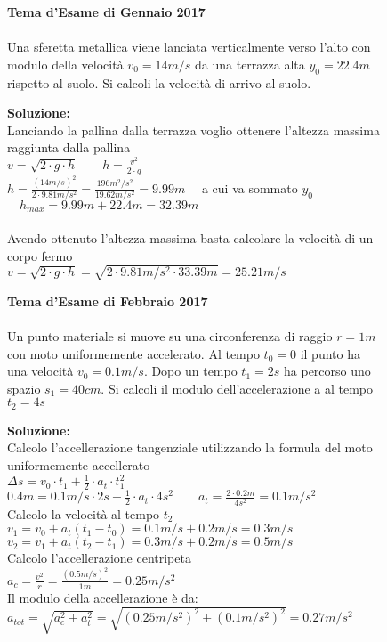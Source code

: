 \begin{figure}[h!]
\textbf{Tema d'Esame di Gennaio 2017}\\ \\
Una sferetta metallica viene lanciata verticalmente verso l’alto con modulo della velocità
$v_0= 14 m/s$  da una terrazza alta $y_0 = 22.4m$ rispetto al suolo. Si calcoli la velocità di arrivo al suolo. \\
\begin{boxed}
\textbf{Soluzione:}\\
Lanciando la pallina dalla terrazza voglio ottenere l'altezza massima raggiunta dalla pallina\\
$v=\sqrt{2\cdot g \cdot h} \qquad h=\frac{v^2}{2\cdot g}$\\
$h=\frac{(14m/s)^2}{2\cdot 9.81 m/s^2} = \frac{196m^2/s^2}{19.62 m/s^2}=9.99m \quad$ a cui va  sommato $y_0$ \\
$\quad h_{max}= 9.99m + 22.4m = 32.39m$\\ \\
Avendo ottenuto l'altezza massima basta calcolare la velocità di un corpo fermo\\
$v=\sqrt{2\cdot g\cdot h} = \sqrt{2\cdot 9.81m/s^2\cdot 33.39m}=25.21m/s$
\end{boxed}
\end{figure}



\begin{figure}[h!]
\textbf{Tema d'Esame di Febbraio 2017}\\ \\
 Un punto materiale si muove su una circonferenza di raggio $r = 1 m$ con moto
uniformemente accelerato. Al tempo $t_0 = 0$ il punto ha una velocità $v_0 = 0.1 m/s$. Dopo un tempo $t_1 = 2 s$ ha percorso uno spazio $s_1 = 40 cm$. Si calcoli il modulo dell’accelerazione a al tempo $t_2 = 4 s$

\begin{boxed}
\textbf{Soluzione:}\\
Calcolo l'accellerazione tangenziale utilizzando la formula del moto uniformemente accellerato\\
$\Delta s=v_0\cdot t_1+\frac{1}{2}\cdot a_t\cdot t_1^2$\\
$0.4m=0.1m/s\cdot 2s +\frac{1}{2}\cdot a_t \cdot 4s^2 \qquad a_t=\frac{2\cdot 0.2m}{4s^2}=0.1m/s^2$\\
Calcolo la velocità al tempo $t_2$\\
$v_1=v_0+a_t(t_1-t_0)=0.1m/s+0.2m/s=0.3m/s $\\
$v_2=v_1+a_t(t_2-t_1)=0.3m/s+0.2m/s=0.5m/s $\\
Calcolo l'accellerazione centripeta\\
$a_c=\frac{v^2}{r}=\frac{(0.5m/s)^2}{1m}=0.25m/s^2$\\
Il modulo della accellerazione è da:\\
$a_{tot}=\sqrt{a_c^2+a_t^2}=\sqrt{(0.25m/s^2)^2+(0.1m/s^2)^2}=0.27m/s^2$
\end{boxed}
\end{figure}



